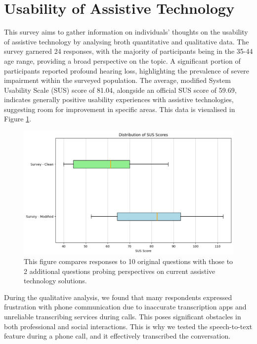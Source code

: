 \documentclass{l4proj}
\begin{document}
\section{Usability of Assistive Technology}
\label{sec:use-survey}

This survey aims to gather information on individuals' thoughts on the usability of assistive technology by analysing broth quantitative and qualitative data. The survey garnered 24 responses, with the majority of participants being in the 35-44 age range, providing a broad perspective on the topic. A significant portion of participants reported profound hearing loss, highlighting the prevalence of severe impairment within the surveyed population. The average, modified System Usability Scale (SUS) score of 81.04, alongside an official SUS score of 59.69, indicates generally positive usability experiences with assistive technologies, suggesting room for improvement in specific areas. This data is visualised in Figure \ref{fig:survey-SUS}.

\begin{figure}
    \centering
    \includegraphics[width=0.9\linewidth]{dissertation/images/SUSSurvey.png}    
    \caption{This figure compares responses to 10 original questions with those to 2 additional questions probing perspectives on current assistive technology solutions.}
    \label{fig:survey-SUS} 
\end{figure}

During the qualitative analysis, we found that many respondents expressed frustration with phone communication due to inaccurate transcription apps and unreliable transcribing services during calls. This poses significant obstacles in both professional and social interactions. This is why we tested the speech-to-text feature during a phone call, and it effectively transcribed the conversation.
\end{document}
